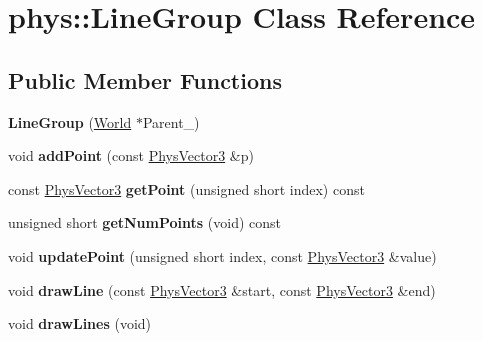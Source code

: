 \hypertarget{classphys_1_1LineGroup}{
\section{phys::LineGroup Class Reference}
\label{db/ddb/classphys_1_1LineGroup}
}
\subsection*{Public Member Functions}
\begin{DoxyCompactItemize}
\item 
\hypertarget{classphys_1_1LineGroup_a676039a6beec56d24c631e9da5fd7e76}{
{\bfseries LineGroup} (\hyperlink{classphys_1_1World}{World} $\ast$Parent\_\-)}
\label{db/ddb/classphys_1_1LineGroup_a676039a6beec56d24c631e9da5fd7e76}

\item 
\hypertarget{classphys_1_1LineGroup_a550582bde23059645b5966a384734131}{
void {\bfseries addPoint} (const \hyperlink{classPhysVector3}{PhysVector3} \&p)}
\label{db/ddb/classphys_1_1LineGroup_a550582bde23059645b5966a384734131}

\item 
\hypertarget{classphys_1_1LineGroup_a1f8366cdcb04a993639439cc3d8b21f7}{
const \hyperlink{classPhysVector3}{PhysVector3} {\bfseries getPoint} (unsigned short index) const }
\label{db/ddb/classphys_1_1LineGroup_a1f8366cdcb04a993639439cc3d8b21f7}

\item 
\hypertarget{classphys_1_1LineGroup_af067776a5c13cc9a31837c17a74c8531}{
unsigned short {\bfseries getNumPoints} (void) const }
\label{db/ddb/classphys_1_1LineGroup_af067776a5c13cc9a31837c17a74c8531}

\item 
\hypertarget{classphys_1_1LineGroup_a6f579620fcccb26adde37e7953e10271}{
void {\bfseries updatePoint} (unsigned short index, const \hyperlink{classPhysVector3}{PhysVector3} \&value)}
\label{db/ddb/classphys_1_1LineGroup_a6f579620fcccb26adde37e7953e10271}

\item 
\hypertarget{classphys_1_1LineGroup_aed46446e634948f8c73a5b26406cb5af}{
void {\bfseries drawLine} (const \hyperlink{classPhysVector3}{PhysVector3} \&start, const \hyperlink{classPhysVector3}{PhysVector3} \&end)}
\label{db/ddb/classphys_1_1LineGroup_aed46446e634948f8c73a5b26406cb5af}

\item 
\hypertarget{classphys_1_1LineGroup_ade1bb4f8e1164e1b8d7aeabbc970b79d}{
void {\bfseries drawLines} (void)}
\label{db/ddb/classphys_1_1LineGroup_ade1bb4f8e1164e1b8d7aeabbc970b79d}


\end{DoxyCompactItemize}
